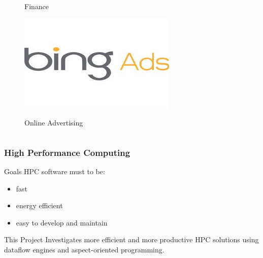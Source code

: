 \begin{frame}
\begin{columns}
\begin{center}
\begin{figure}
        \caption{Finance}
      \end{figure}
      \begin{figure}
        \includegraphics[scale=0.31]{figs/ads.jpg}\\
        \caption{Online Advertising}
      \end{figure}
    \end{center}
  \end{columns}
\end{frame}

\begin{frame}
  \frametitle{High Performance Computing}
  \begin{beamerboxesrounded}{Goals}
    HPC software must to be:
    \begin{itemize}
      \item fast
      \item energy efficient
      \item easy to develop and maintain
    \end{itemize}
    \end{beamerboxesrounded}
    \vspace{0.75cm}
  \begin{beamerboxesrounded}{This Project}
    Investigates more efficient and more productive HPC solutions using
    dataflow engines and aspect-oriented programming.
  \end{beamerboxesrounded}
\end{frame}

